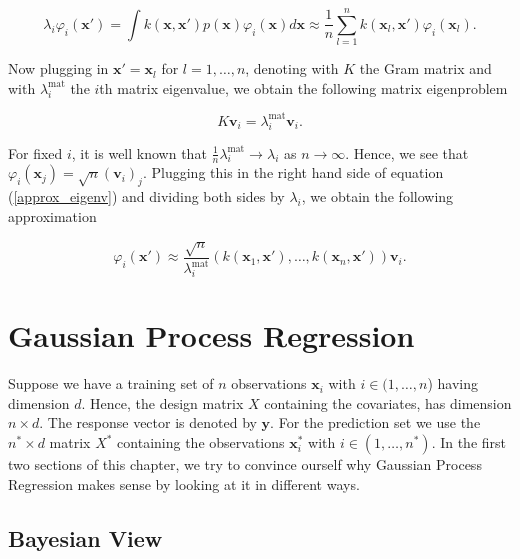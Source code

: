 \documentclass[12pt,a4paper,oneside]{book}
\begin{document}
\begin{equation}\label{approx_eigenv}
\lambda_i \varphi_i(\bm{x}') = \int k(\bm{x},\bm{x}') p(\bm{x}) \varphi_i(\bm{x}) d\bm{x} \approx \dfrac{1}{n}  \sum_{l=1}^n k(\bm{x}_l, \bm{x}') \varphi_i(\bm{x}_l). 
\end{equation}

Now plugging in $\bm{x}' = \bm{x}_l$ for $ l = 1, \ldots, n$, denoting with $K$ the Gram matrix and with $\lambda_i^{\text{mat}}$ the $i$th matrix eigenvalue, we obtain the following matrix eigenproblem 

\begin{equation}
K \bm{v}_i = \lambda_i^{\text{mat}} \bm{v}_i .
\end{equation}

For fixed $i$, it is well known that $\frac{1}{n} \lambda_i^{\text{mat}} \rightarrow \lambda_i$ as $n \rightarrow \infty$. Hence, we see that $\varphi_i(\bm{x}_j) = \sqrt{n} (\bm{v}_i)_j$. Plugging this in the right hand side of equation (\ref{approx_eigenv}) and dividing both sides by $\lambda_i$, we obtain the following approximation  

\begin{equation}\label{approx_eigenvector}
\varphi_i(\bm{x}') \approx \dfrac{\sqrt{n}}{\lambda_i^{\text{mat}}} (k(\bm{x}_1,\bm{x}'), \ldots, k(\bm{x}_n,\bm{x}')) \bm{v}_i.
\end{equation} 

 
\chapter{Gaussian Process Regression} 

Suppose we have a training set of $n$ observations $\bm{x}_i$ with $i \in (1, \ldots,n$) having dimension $d$. Hence, the design matrix $X$ containing the covariates, has dimension $n \times d$. The response vector is denoted by $\bm{y}$. For the  prediction set we use the $n^{\ast} \times d$ matrix $X^{\ast}$ containing the observations $\bm{x}^{\ast}_i$ with $i \in (1, \ldots,n^{\ast})$. In the first two sections of this chapter, we try to convince ourself why Gaussian Process Regression makes sense by looking at it in different ways. 


\section{Bayesian View} \label{section_bayesian_view}
\end{document}
